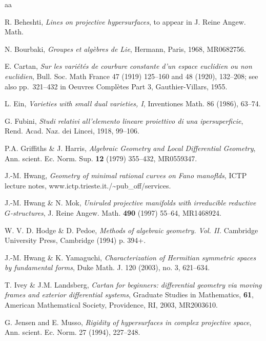 \documentclass[11pt]{amsart}
\theoremstyle{definition}
\theoremstyle{remark}
\numberwithin{equation}{section}
\begin{document}
 

\begin{thebibliography}{aa}

 
 R. Beheshti,   {\it Lines on projective hypersurfaces}, 
to appear in J. Reine Angew. Math.



 N. Bourbaki,
{\it Groupes et alg\`ebres de Lie}, 
Hermann, Paris, 1968,
MR0682756.

 E. Cartan, {\it Sur les vari\'et\'es de courbure constante d'un
espace euclidien ou non euclidien},
{  Bull. Soc. Math France} 47 (1919) 125--160
and  48 (1920), 132--208; see also pp.~321--432 in
{  Oeuvres Compl\`etes} Part 3, Gauthier-Villars, 1955.


 L. Ein,
{\it Varieties with small dual varieties, I},
{ Inventiones Math.} 86 (1986), 63--74.

 G. Fubini, 
{\it Studi relativi all'elemento lineare
proiettivo di una ipersuperficie}, 
Rend. Acad. Naz. dei Lincei, 1918, 99--106.  
 
 P.A. Griffiths \& J. Harris, 
{\it Algebraic Geometry and
Local Differential Geometry}, 
Ann. scient. Ec. Norm. Sup. {\bf 12} (1979) 355--432,
MR0559347.

 J.-M. Hwang,  
{\it  Geometry of minimal rational curves on Fano manoflds}, 
ICTP lecture notes, www.ictp.trieste.it./\~{}pub\_off/services.

 J.-M. Hwang \& N. Mok, 
{\it Uniruled projective manifolds with 
irreducible reductive $G$-structures}, 
J. Reine Angew. Math. {\bf 490} (1997) 55--64,
MR1468924.


W. V. D. Hodge \& D. Pedoe, 
{\it Methods of algebraic geometry. Vol. II.}   
Cambridge University Press, Cambridge (1994) p. 394+.

J.-M. Hwang \& K. Yamaguchi, 
{\it Characterization of Hermitian symmetric spaces by fundamental forms},
Duke Math. J.  120  (2003),  no. 3, 621--634. 

 T. Ivey \& J.M. Landsberg,
{\it Cartan for beginners: differential geometry via moving frames and
exterior differential systems}, 
Graduate Studies in Mathematics, {\bf 61},
American Mathematical Society, Providence, RI, 2003,
MR2003610.


 G. Jensen  and E. Musso,
{\it Rigidity of hypersurfaces in complex projective space},
{  Ann. scient. Ec. Norm.} 27 (1994), 227--248.


\end{thebibliography}
\end{document}
